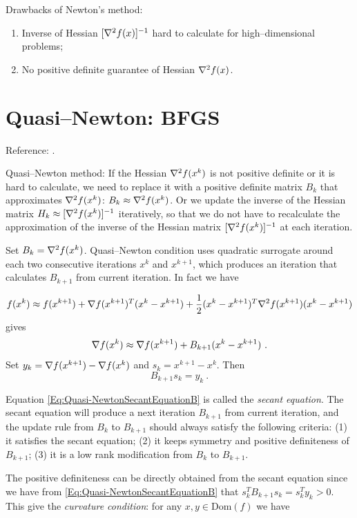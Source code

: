 Drawbacks of Newton's method:

\begin{enumerate} 
\item[(1)] Inverse of Hessian $[\nabla^2 f(x)]^{-1}$ hard to calculate for high--dimensional problems;

\item[(2)] No positive definite guarantee of Hessian $\nabla^2 f(x)$.
\end{enumerate}

\section{Quasi--Newton: BFGS}

Reference: \cite{DennisMoreQuasiNewtonSIAMReview}.

Quasi--Newton method: If the Hessian $\nabla^2 f(x^k)$ is not positive definite or it is hard to calculate,
we need to replace it with a positive definite matrix $B_k$
that approximates $\nabla^2 f(x^k)$: $B_k \approx \nabla^2 f(x^k)$.
Or we update the inverse of the Hessian matrix $H_k\approx [\nabla^2 f(x^k)]^{-1}$ iteratively, so that we do not have to recalculate
the approximation of the inverse of the
Hessian matrix $[\nabla^2 f(x^k)]^{-1}$ at each iteration.

Set $B_k=\nabla^2 f(x^k)$. Quasi--Newton condition uses quadratic surrogate around each two consecutive iterations
$x^k$ and $x^{k+1}$, which produces an iteration that calculates $B_{k+1}$ from current iteration. In fact we have

$$f(x^k)\approx f(x^{k+1})+\nabla f(x^{k+1})^T(x^k-x^{k+1})+\dfrac{1}{2}(x^k-x^{k+1})^T\nabla^2 f(x^{k+1})(x^k-x^{k+1})$$
gives
$$\nabla f(x^k)\approx \nabla f(x^{k+1})+B_{k+1}(x^k-x^{k+1}) \ .$$
Set $y_k=\nabla f(x^{k+1})-\nabla f(x^k)$ and $s_k=x^{k+1}-x^k$. Then
\begin{equation}\label{Eq:Quasi-NewtonSecantEquationB}
B_{k+1}s_k=y_k \ .
\end{equation}

Equation \eqref{Eq:Quasi-NewtonSecantEquationB} is called the \textit{secant equation}. The secant equation will produce
a next iteration $B_{k+1}$ from current iteration, and the update rule from $B_k$ to $B_{k+1}$ should always satisfy the following
criteria: (1) it satisfies the secant equation; (2) it keeps symmetry and positive definiteness of $B_{k+1}$;
(3) it is a low rank modification from $B_k$ to $B_{k+1}$.

The positive definiteness can be directly obtained from the secant equation since we have from
\eqref{Eq:Quasi-NewtonSecantEquationB} that $s_k^T B_{k+1} s_k=s_k^T y_k>0$. This give the \textit{curvature condition}:
for any $x,y \in \text{Dom}(f)$ we have


